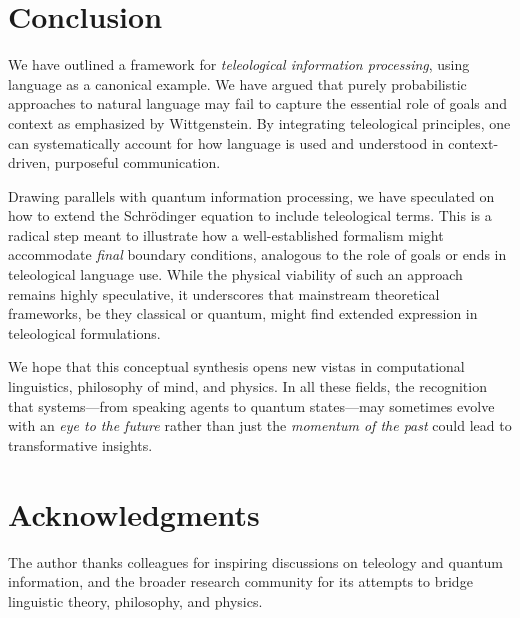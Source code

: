 \documentclass[11pt]{article}
\begin{document}
\section{Conclusion}
\label{sec:conclusion}
We have outlined a framework for \emph{teleological information processing}, using language as a canonical example. We have argued that purely probabilistic approaches to natural language may fail to capture the essential role of goals and context as emphasized by Wittgenstein. By integrating teleological principles, one can systematically account for how language is used and understood in context-driven, purposeful communication.

Drawing parallels with quantum information processing, we have speculated on how to extend the Schr\"odinger equation to include teleological terms. This is a radical step meant to illustrate how a well-established formalism might accommodate \emph{final} boundary conditions, analogous to the role of goals or ends in teleological language use. While the physical viability of such an approach remains highly speculative, it underscores that mainstream theoretical frameworks, be they classical or quantum, might find extended expression in teleological formulations.

We hope that this conceptual synthesis opens new vistas in computational linguistics, philosophy of mind, and physics. In all these fields, the recognition that systems---from speaking agents to quantum states---may sometimes evolve with an \emph{eye to the future} rather than just the \emph{momentum of the past} could lead to transformative insights. 

\section*{Acknowledgments}
The author thanks colleagues for inspiring discussions on teleology and quantum information, and the broader research community for its attempts to bridge linguistic theory, philosophy, and physics.
\end{document}

